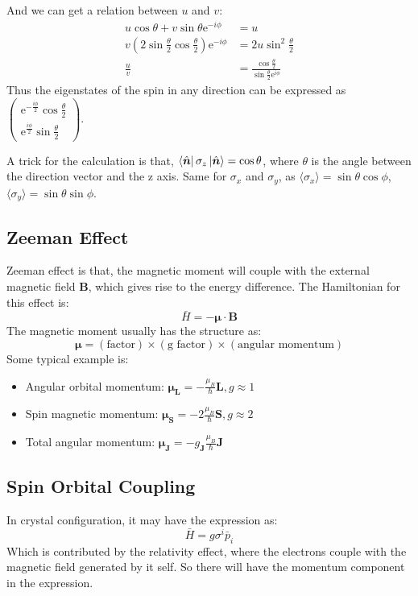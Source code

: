 \documentclass[../main.tex]{subfiles}
\begin{document}
And we can get a relation between $u$ and $v$:
\begin{align}
    u\cos\theta + v\sin\theta\textrm{e}^{-i\phi} &= u \nonumber\\
    v(2\sin\frac{\theta}{2}\cos\frac{\theta}{2})\textrm{e}^{-i\phi} &= 2u\sin^2\frac{\theta}{2}\nonumber\\
    \frac{u}{v} &= \frac{\cos\frac{\theta}{2}}{\sin\frac{\theta}{2}\textrm{e}^{i\phi}}
\end{align}
Thus the eigenstates of the spin in any direction can be expressed as $\begin{pmatrix}
    \textrm{e}^{-\frac{i\phi}{2}}\cos\frac{\theta}{2}\\ \textrm{e}^{\frac{i\phi}{2}}\sin\frac{\theta}{2}
\end{pmatrix}$.

A trick for the calculation is that, $\bra{\hat{\bm{n}}}\sigma_z\ket{\hat{\bm{n}}} = \cos\theta$, where $\theta$ is
the angle between the direction vector and the z axis. Same for $\sigma_x$ and $\sigma_y$, as  $\langle\sigma_x\rangle = \sin\theta\cos\phi$, $\langle\sigma_y\rangle = \sin\theta\sin\phi$.


\subsection{Zeeman Effect}
Zeeman effect is that, the magnetic moment will couple with the external magnetic field $\bm{B}$, which gives rise to
the energy difference. The Hamiltonian for this effect is:
\begin{equation}
    \bar{H} =  -\bm{\mu}\cdot\bm{B}
\end{equation}
The magnetic moment usually has the structure as:
\begin{equation}
    \bm{\mu} = (\text{factor}) \times (\text{g factor}) \times (\text{angular momentum})
\end{equation}
Some typical example is:
\begin{itemize}
    \item Angular orbital momentum: $\bm{\mu}_{\bm{L}} = -\frac{\mu_B}{\hbar}\bm{L}, g\approx 1$
    \item Spin magnetic momentum: $\bm{\mu}_{\bm{S}} = -2\frac{\mu_B}{\hbar}\bm{S}, g\approx 2$
    \item Total angular momentum: $\bm{\mu}_{\bm{J}} = -g_{\bm{J}}\frac{\mu_B}{\hbar}\bm{J}$
\end{itemize}



\subsection{Spin Orbital Coupling}
In crystal configuration, it may have the expression as:
\begin{equation}
    \bar{H} = g\sigma^i \bar{p}_i
\end{equation}
Which is contributed by the relativity effect, where the electrons couple with the magnetic field generated by
it self. So there will have the momentum component in the expression.
\end{document}
